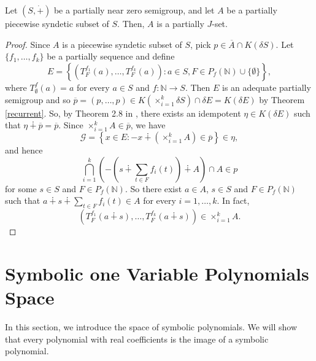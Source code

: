 \documentclass[twoside,11pt]{article}
\begin{document}
\begin{theorem} \label{Jset}
	Let \( (S,\dot{+}) \) be a partially near zero semigroup, and let \( A \) be a partially piecewise syndetic subset of \( S \). Then, \( A \) is a partially \( J \)-set.
\end{theorem}

\begin{proof}
	Since $A$ is a piecewise syndetic subset of $S$, pick $p \in \overline{A} \cap K(\delta S)$. Let $\{f_1,\dots,f_k\}$ be a partially sequence and define  
	\[
	E = \left\{ (T_F^{f_1}(a),\dots,T_F^{f_k}(a)) : a \in S, F \in P_f(\mathbb{N}) \cup \{\emptyset\} \right\},
	\]
	where $T_\emptyset^f(a) = a$ for every $a \in S$ and $f:{\mathbb{N}}\to S$. Then $E$ is an adequate partially semigroup and so $\overline{p} = (p,\dots,p) \in K\left( \times_{i=1}^k\delta S \right) \cap \delta E = K(\delta E)$ by Theorem \ref{recurrent}. So, by Theorem 2.8 in \cite{Hindman}, there exists an idempotent $\eta \in K(\delta E)$ such that $\eta \dotplus \overline{p} = \overline{p}$. Since $\times_{i=1}^k A \in \overline{p}$, we have 
	\[
	\mathcal{G} = \left\{ x \in E : -x \dotplus \left( \times_{i=1}^k A \right) \in \overline{p} \right\} \in \eta,
	\]
	and hence 
	\[
	\bigcap_{i=1}^k \left( -\left(s \dotplus \sum_{t\in F} f_i(t)\right) \dotplus A \right) \cap A \in p
	\]
	for some $s \in S$ and $F \in P_f(\mathbb{N})$. So there exist $a \in A$, $s \in S$ and $F \in P_f(\mathbb{N})$ such that $a \dotplus s \dotplus \sum_{t\in F} f_i(t) \in A$ for every $i=1,\dots,k$. In fact,
	\[
	(T_F^{f_1}(a \dotplus s),\dots,T_F^{f_k}(a \dotplus s)) \in \times_{i=1}^k A.
	\] 
\end{proof}

\section{\bf Symbolic one Variable Polynomials Space}
In this section, we introduce the space of symbolic polynomials. We will show that every polynomial with real coefficients is the image of a symbolic polynomial. 
\end{document}

